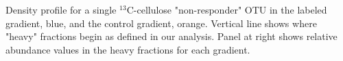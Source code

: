 Density profile for a single $^{13}$C-cellulose "non-responder" OTU in the labeled gradient, blue, and the control gradient, orange. Vertical line shows where "heavy" fractions begin as defined in our analysis. Panel at right shows relative abundance values in the heavy fractions for each gradient.